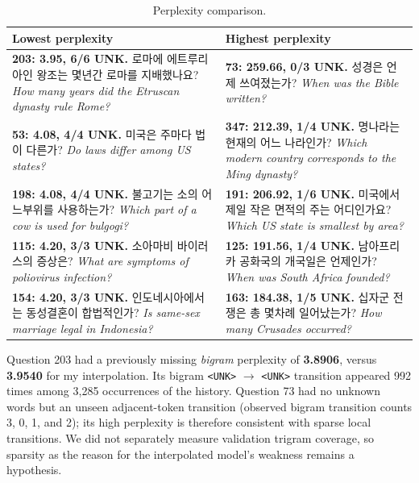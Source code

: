 \documentclass[11pt,a4paper,twocolumn]{article}
\renewcommand{\arraystretch}{1.07}
\begin{document}
\begin{table}[t]
\centering\footnotesize
\setlength{\tabcolsep}{5pt}
\renewcommand{\arraystretch}{1.10}
\begin{tabularx}{\textwidth}{@{}>{\raggedright\arraybackslash}X>{\raggedright\arraybackslash}X@{}}
\toprule
\textbf{Lowest perplexity} & \textbf{Highest perplexity}\\
\midrule
\textbf{203: 3.95, 6/6 UNK.} 로마에 에트루리아인 왕조는 몇년간 로마를 지배했나요? \emph{How many years did the Etruscan dynasty rule Rome?} & \textbf{73: 259.66, 0/3 UNK.} 성경은 언제 쓰여졌는가? \emph{When was the Bible written?}\\
\textbf{53: 4.08, 4/4 UNK.} 미국은 주마다 법이 다른가? \emph{Do laws differ among US states?} & \textbf{347: 212.39, 1/4 UNK.} 명나라는 현재의 어느 나라인가? \emph{Which modern country corresponds to the Ming dynasty?}\\
\textbf{198: 4.08, 4/4 UNK.} 불고기는 소의 어느부위를 사용하는가? \emph{Which part of a cow is used for bulgogi?} & \textbf{191: 206.92, 1/6 UNK.} 미국에서 제일 작은 면적의 주는 어디인가요? \emph{Which US state is smallest by area?}\\
\textbf{115: 4.20, 3/3 UNK.} 소아마비 바이러스의 증상은? \emph{What are symptoms of poliovirus infection?} & \textbf{125: 191.56, 1/4 UNK.} 남아프리카 공화국의 개국일은 언제인가? \emph{When was South Africa founded?}\\
\textbf{154: 4.20, 3/3 UNK.} 인도네시아에서는 동성결혼이 합법적인가? \emph{Is same-sex marriage legal in Indonesia?} & \textbf{163: 184.38, 1/5 UNK.} 십자군 전쟁은 총 몇차례 일어났는가? \emph{How many Crusades occurred?}\\
\bottomrule
\end{tabularx}
\caption {Perplexity comparison.}
\label{tab:examples}
\end{table}

Question 203 had a previously missing \emph{bigram} perplexity of \textbf{3.8906}, versus \textbf{3.9540} for my interpolation. Its bigram \texttt{<UNK>} $\rightarrow$ \texttt{<UNK>} transition appeared 992 times among 3,285 occurrences of the history. Question 73 had no unknown words but an unseen adjacent-token transition (observed bigram transition counts 3, 0, 1, and 2); its high perplexity is therefore consistent with sparse local transitions. We did not separately measure validation trigram coverage, so sparsity as the reason for the interpolated model's weakness remains a hypothesis.
\end{document}
